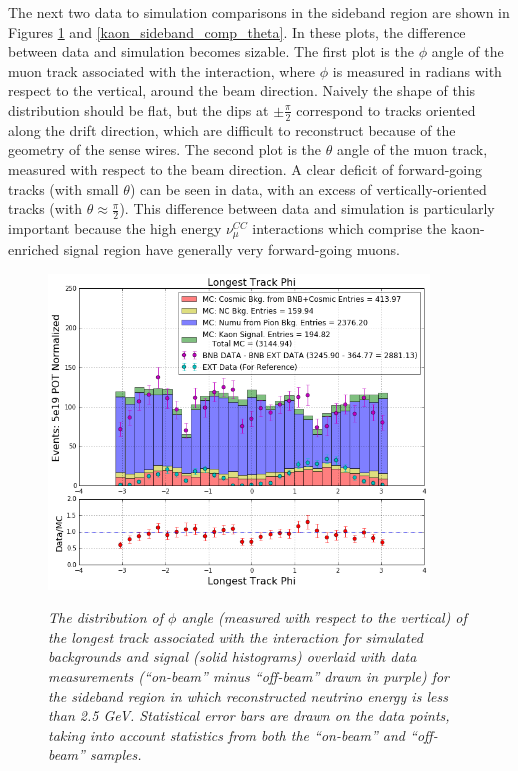 The next two data to simulation comparisons in the sideband region are shown in Figures \ref{kaon_sideband_comp_phi} and \ref{kaon_sideband_comp_theta}. In these plots, the difference between data and simulation becomes sizable. The first plot is the $\phi$ angle of the muon track associated with the interaction, where $\phi$ is measured in radians with respect to the vertical, around the beam direction. Naively the shape of this distribution should be flat, but the dips at $\pm\frac{\pi}{2}$ correspond to tracks oriented along the drift direction, which are difficult to reconstruct because of the geometry of the sense wires. The second plot is the $\theta$ angle of the muon track, measured with respect to the beam direction. A clear deficit of forward-going tracks (with small $\theta$) can be seen in data, with an excess of vertically-oriented tracks (with $\theta\approx\frac{\pi}{2}$). This difference between data and simulation is particularly important because the high energy $\nu_\mu^{CC}$ interactions which comprise the kaon-enriched signal region have generally very forward-going muons.\\

\begin{figure}[ht!]
\centering
	\includegraphics[width=0.9\textwidth]{Figures/kaon_sideband_comp_phi.png} \\
\caption{\textit{The distribution of $\phi$ angle (measured with respect to the vertical) of the longest track associated with the interaction for simulated backgrounds and signal (solid histograms) overlaid with data measurements (``on-beam'' minus ``off-beam'' drawn in purple) for the sideband region in which reconstructed neutrino energy is less than 2.5 GeV. Statistical error bars are drawn on the data points, taking into account statistics from both the ``on-beam'' and ``off-beam'' samples.}}\label{kaon_sideband_comp_phi}
\end{figure}



